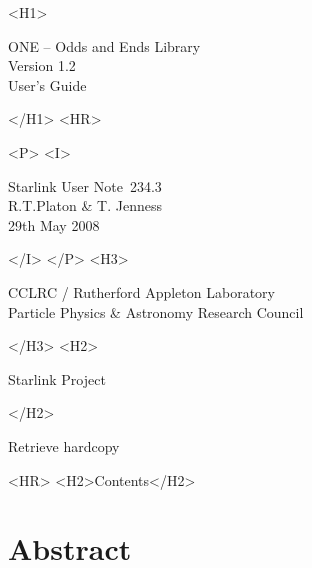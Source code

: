 \documentclass[twoside,11pt]{article}
\newcommand{\stardoccategory}  {Starlink User Note}
\newcommand{\stardocsource}    {sun\stardocnumber}
\newcommand{\stardocnumber}    {234.3}
\newcommand{\stardocauthors}   {R.T.Platon \& T. Jenness}
\newcommand{\stardocdate}      {29th May 2008}
\newcommand{\stardoctitle}     {ONE -- Odds and Ends Library}
\newcommand{\stardocversion}   {Version 1.2}
\newcommand{\stardocmanual}    {User's Guide}
\newcommand{\htmladdnormallink}[2]{#1}
\newcommand{\htmladdimg}[1]{}
\newcommand{\htmlref}[2]{#1}
\newcommand{\htmladdtonavigation}[1]{}
\newcommand{\xlabel}[1]{}
\renewcommand{\_}{\texttt{\symbol{95}}}
\begin{document}
\begin{htmlonly}
   \xlabel{}
   \begin{rawhtml} <H1> \end{rawhtml}
      \stardoctitle\\
      \stardocversion\\
      \stardocmanual
   \begin{rawhtml} </H1> <HR> \end{rawhtml}


   \begin{rawhtml} <P> <I> \end{rawhtml}
   \stardoccategory\ \stardocnumber \\
   \stardocauthors \\
   \stardocdate
   \begin{rawhtml} </I> </P> <H3> \end{rawhtml}
      \htmladdnormallink{CCLRC / Rutherford Appleton Laboratory}
                        {http://www.cclrc.ac.uk} \\
      \htmladdnormallink{Particle Physics \& Astronomy Research Council}
                        {http://www.pparc.ac.uk} \\
   \begin{rawhtml} </H3> <H2> \end{rawhtml}
      \htmladdnormallink{Starlink Project}{http://www.starlink.rl.ac.uk/}
   \begin{rawhtml} </H2> \end{rawhtml}
   \htmladdnormallink{\htmladdimg{source.gif} Retrieve hardcopy}
      {http://www.starlink.rl.ac.uk/cgi-bin/hcserver?\stardocsource}\\

  \label{stardoccontents}
  \begin{rawhtml} 
    <HR>
    <H2>Contents</H2>
  \end{rawhtml}
  \htmladdtonavigation{\htmlref{\htmladdimg{contents_motif.gif}}
        {stardoccontents}}

  \section{\xlabel{abstract}Abstract}
\end{htmlonly}
\end{document}
